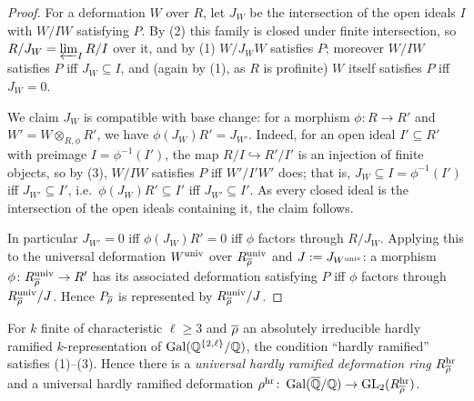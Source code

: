 \documentclass[11pt]{article}
\begin{document}
\begin{proof}
For a deformation $W$ over $R$, let $J_W$ be the intersection of the open ideals
$I$ with $W/IW$ satisfying $P$. By (2) this family is closed under finite
intersection, so $R/J_W=\varprojlim_I R/I$ over it, and by (1) $W/J_WW$ satisfies
$P$; moreover $W/IW$ satisfies $P$ iff $J_W\subseteq I$, and (again by (1), as
$R$ is profinite) $W$ itself satisfies $P$ iff $J_W=0$.

We claim $J_W$ is compatible with base change: for a morphism $\phi\colon R\to R'$
and $W'=W\otimes_{R,\phi}R'$, we have $\phi(J_W)R'=J_{W'}$. Indeed, for an open
ideal $I'\subseteq R'$ with preimage $I=\phi^{-1}(I')$, the map
$R/I\hookrightarrow R'/I'$ is an injection of finite objects, so by (3),
$W/IW$ satisfies $P$ iff $W'/I'W'$ does; that is, $J_W\subseteq I=\phi^{-1}(I')$
iff $J_{W'}\subseteq I'$, i.e.\ $\phi(J_W)R'\subseteq I'$ iff $J_{W'}\subseteq I'$.
As every closed ideal is the intersection of the open ideals containing it, the
claim follows.

In particular $J_{W'}=0$ iff $\phi(J_W)R'=0$ iff $\phi$ factors through
$R/J_W$. Applying this to the universal deformation $W^{\mathrm{univ}}$ over
$R^{\mathrm{univ}}_{\overline{\rho}}$ and $J:=J_{W^{\mathrm{univ}}}$: a morphism $\phi\colon
R^{\mathrm{univ}}_{\overline{\rho}}\to R'$ has its associated deformation satisfying $P$ iff
$\phi$ factors through $R^{\mathrm{univ}}_{\overline{\rho}}/J$. Hence $P_{\overline{\rho}}$ is
represented by $R^{\mathrm{univ}}_{\overline{\rho}}/J$.
\end{proof}

\begin{proposition}\label{prop:hr-condition}
For $k$ finite of characteristic $\ell\geq3$ and $\overline{\rho}$ an absolutely
irreducible hardly ramified $k$-representation of $\operatorname{Gal}(\mathbb{Q}^{\{2,\ell\}}/\mathbb{Q})$,
the condition ``hardly ramified'' satisfies \textup{(1)}--\textup{(3)}. Hence
there is a \emph{universal hardly ramified deformation ring}
$R^{\mathrm{hr}}_{\overline{\rho}}$ and a universal hardly ramified deformation
$\rho^{\mathrm{hr}}\colon\operatorname{Gal}(\overline{\mathbb{Q}}/\mathbb{Q})\to\operatorname{GL}_2(R^{\mathrm{hr}}_{\overline{\rho}})$.
\end{proposition}
\end{document}
